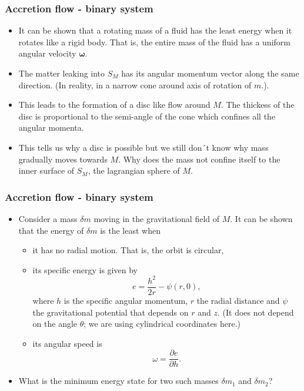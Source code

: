 \documentclass{beamer}
\renewcommand{\vec}{\bm}
\begin{document}
\begin{frame}
\frametitle{Accretion flow - binary system}
\begin{itemize}
\item It can be shown that a rotating mass of a fluid has the least energy when it rotates like a rigid body. That is, the entire mass of the fluid has a uniform
angular velocity $\vec{\omega}$.
\item The matter leaking into $S_M$ has its angular momentum vector along the same direction. (In reality, in a narrow cone around axis of
rotation of $m$.). 
\item This leads to the formation of a disc like flow around $M$. The thickess of the disc is proportional to the semi-angle of the cone which confines all
the angular momenta.
\item This tells us why a disc is possible but we still don´t know why mass gradually moves towards $M$. Why does the mass not confine itself to the inner
surface of $S_M$, the lagrangian sphere of $M$.
\end{itemize}
\end{frame}

\begin{frame}
\frametitle{Accretion flow - binary system}
\begin{itemize}
\item Consider a mass $\delta m$ moving in the gravitational field of $M$. It can be shown that the energy of $\delta m$ is the least when 
\begin{itemize}
\item it has no radial motion. That is, the orbit is circular,
\item its specific energy is given by
\begin{equation}\label{e7}
e = \frac{h^2}{2r} - \psi(r, 0),
\end{equation}
where $h$ is the specific angular momentum, $r$ the radial distance and $\psi$ the gravitational potential that depends on $r$ and $z$. (It does not depend on
the angle $\theta$; we are using cylindrical coordinates here.)
\item its angular speed is
\begin{equation}\label{e8}
\omega = \frac{\partial e}{\partial h}.
\end{equation}
\end{itemize}
\item What is the minimum energy state for two such masses $\delta m_1$ and $\delta m_2$?
\end{itemize}
\end{frame}
\end{document}
